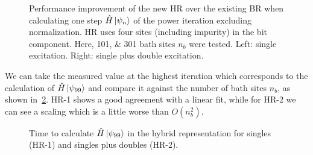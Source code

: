 \begin{figure}
    \centering
    
    \caption{
        Performance improvement of the new HR over the existing BR
        when calculating one step $\hat{H} \ket{\psi_n}$ of the power iteration
        excluding normalization.
        HR uses four sites (including impurity) in the bit component.
        Here, \numlist{101; 301} bath sites $n_b$ were tested.
        Left: single excitation.
        Right: single plus double excitation.
    }
    \label{fig:performance-improvement-iteration}
\end{figure}

We can take the measured value at the highest iteration which corresponds to
the calculation of $\hat{H}\ket{\psi_{99}}$ and compare it against the number of
bath sites $n_b$,
as shown in~\cref{fig:ciwf-scaling}.
HR-1 shows a good agreement with a linear fit,
while for HR-2 we can see a scaling which is a little worse than $O(n_b^2)$.

\begin{figure}[htb!]
    \centering
    
    \caption{
        Time to calculate $\hat{H}\ket{\psi_{99}}$ in the
        hybrid representation for singles (HR-1)
        and singles plus doubles (HR-2).
    }
    \label{fig:ciwf-scaling}
\end{figure}
